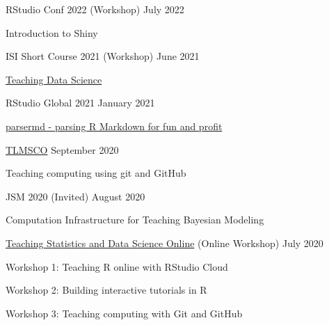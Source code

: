 \documentclass[margin,line]{res}
\begin{document}
\begin{resume}
RStudio Conf 2022 (Workshop) \hfill July 2022
\begin{list1}
\item[] Introduction to Shiny
\end{list1}
\vspace{-3mm}

ISI Short Course 2021 (Workshop) \hfill June 2021
\begin{list1}
\item[] \href{https://mine-cetinkaya-rundel.github.io/teach-ds-wsc-2021/}{Teaching Data Science}
\end{list1}
\vspace{-3mm}

RStudio Global 2021 \hfill January 2021
\begin{list1}
\item[] \href{https://www.rstudio.com/resources/rstudioglobal-2021/parsermd-parsing-r-markdown-for-fun-and-profit/}{parsermd - parsing R Markdown for fun and profit}
\end{list1}
\vspace{-3mm}

\href{https://sites.google.com/view/rssteachingstatisticssig/research-meetings/teaching-and-learning-of-maths-and-stats-computing-online}{TLMSCO} \hfill September 2020
\begin{list1}
\item[] Teaching computing using git and GitHub
\end{list1}
\vspace{-3mm}

JSM 2020 (Invited) \hfill August 2020
\begin{list1}
\item[] Computation Infrastructure for Teaching Bayesian Modeling
\end{list1}
\vspace{-3mm}

\href{http://bit.ly/teach-r-online-mats}{Teaching Statistics and Data Science Online} (Online Workshop) \hfill July 2020
\begin{list1}
\item[] Workshop 1: Teaching R online with RStudio Cloud
\item[] Workshop 2: Building interactive tutorials in R
\item[] Workshop 3: Teaching computing with Git and GitHub
\end{list1} 
\vspace{-3mm}





\end{resume}
\end{document}
